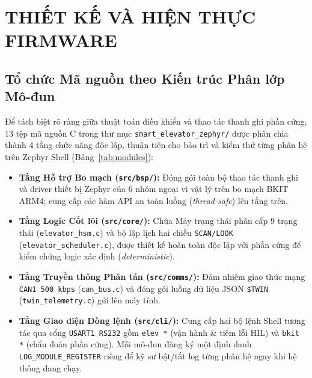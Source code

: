 \clearpage
\section{THIẾT KẾ VÀ HIỆN THỰC FIRMWARE}

\subsection{Tổ chức Mã nguồn theo Kiến trúc Phân lớp Mô-đun}
Để tách biệt rõ ràng giữa thuật toán điều khiển và thao tác thanh ghi phần cứng, 13 tệp mã nguồn C trong thư mục \texttt{smart\_elevator\_zephyr/} được phân chia thành 4 tầng chức năng độc lập, thuận tiện cho bảo trì và kiểm thử từng phân hệ trên Zephyr Shell (Bảng~\ref{tab:modules}):
\begin{itemize}[nosep]
    \item \textbf{Tầng Hỗ trợ Bo mạch (\texttt{src/bsp/}):} Đóng gói toàn bộ thao tác thanh ghi và driver thiết bị Zephyr của 6 nhóm ngoại vi vật lý trên bo mạch BKIT ARM4; cung cấp các hàm API an toàn luồng (\textit{thread-safe}) lên tầng trên.
    \item \textbf{Tầng Logic Cốt lõi (\texttt{src/core/}):} Chứa Máy trạng thái phân cấp 9 trạng thái (\texttt{elevator\_hsm.c}) và bộ lập lịch hai chiều \texttt{SCAN/LOOK} (\texttt{elevator\_scheduler.c}), được thiết kế hoàn toàn độc lập với phần cứng để kiểm chứng logic xác định (\textit{deterministic}).
    \item \textbf{Tầng Truyền thông Phân tán (\texttt{src/comms/}):} Đảm nhiệm giao thức mạng \texttt{CAN1 500 kbps} (\texttt{can\_bus.c}) và đóng gói luồng dữ liệu JSON \texttt{\$TWIN} (\texttt{twin\_telemetry.c}) gửi lên máy tính.
    \item \textbf{Tầng Giao diện Dòng lệnh (\texttt{src/cli/}):} Cung cấp hai bộ lệnh Shell tương tác qua cổng \texttt{USART1 RS232} gồm \texttt{elev *} (vận hành \& tiêm lỗi HIL) và \texttt{bkit *} (chẩn đoán phần cứng). Mỗi mô-đun đăng ký một định danh \texttt{LOG\_MODULE\_REGISTER} riêng để kỹ sư bật/tắt log từng phân hệ ngay khi hệ thống đang chạy.
\end{itemize}

